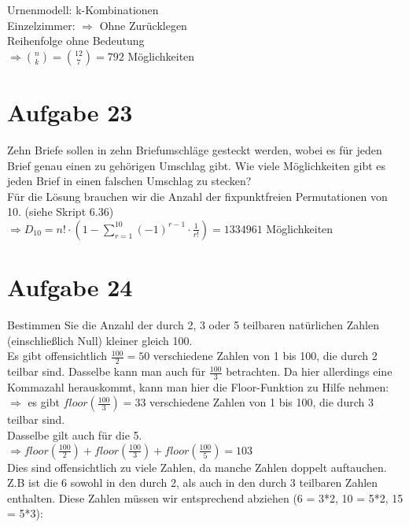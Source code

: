\documentclass[paper = a4, ngerman]{scrartcl}
\begin{document}
	Urnenmodell: k-Kombinationen\\
	
	Einzelzimmer: $\Rightarrow$ Ohne Zurücklegen\\
	Reihenfolge ohne Bedeutung\\
	
	$\Rightarrow \binom{n}{k} = \binom{12}{7} = 792$ Möglichkeiten
	
	
	
	
	\section*{Aufgabe 23}
	Zehn Briefe sollen in zehn Briefumschläge gesteckt werden, wobei es für jeden Brief genau einen zu gehörigen Umschlag gibt. Wie viele Möglichkeiten gibt es jeden Brief in einen falschen Umschlag zu stecken?\\
	
	Für die Lösung brauchen wir die Anzahl der fixpunktfreien Permutationen von 10. (siehe Skript 6.36)\\
	
	
	$\Rightarrow D_{10} = n! \cdot (1- \sum\limits_{r = 1}^{10} (-1)^{r-1}\cdot \frac{1}{r!}) = 1334961$ Möglichkeiten
	
	
	\section*{Aufgabe 24}
	
	Bestimmen Sie die Anzahl der durch 2, 3 oder 5 teilbaren natürlichen Zahlen (einschließlich Null) kleiner gleich 100.\\
	
	Es gibt offensichtlich $\frac{100}{2} = 50$ verschiedene Zahlen von 1 bis 100, die durch 2 teilbar sind.
	Dasselbe kann man auch für $\frac{100}{3}$ betrachten. Da hier allerdings eine Kommazahl herauskommt, kann man hier die Floor-Funktion zu Hilfe nehmen: \\
	$\Rightarrow$ es gibt $floor(\frac{100}{3}) = 33$ verschiedene Zahlen von 1 bis 100, die durch 3 teilbar sind.\\
	Dasselbe gilt auch für die 5.\\
	
	$\Rightarrow floor(\frac{100}{2}) + floor(\frac{100}{3}) +  floor(\frac{100}{5}) = 103$\\
	
	Dies sind offensichtlich zu viele Zahlen, da manche Zahlen doppelt auftauchen. Z.B ist die 6 sowohl in den durch 2, als auch in den durch 3 teilbaren Zahlen enthalten. Diese Zahlen müssen wir entsprechend abziehen (6 = 3*2, 10 = 5*2, 15 = 5*3):\\
	
\end{document}
